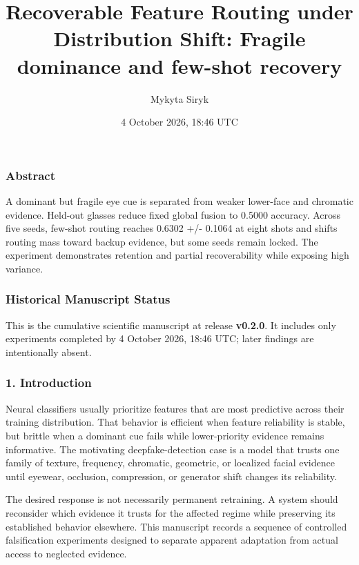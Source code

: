 \documentclass[
  10pt,
]{article}
\title{Recoverable Feature Routing under Distribution Shift: Fragile
dominance and few-shot recovery}
\author{Mykyta Siryk}
\date{4 October 2026, 18:46 UTC}
\begin{document}
\maketitle

\hypertarget{abstract}{%
\subsubsection{Abstract}\label{abstract}}

A dominant but fragile eye cue is separated from weaker lower-face and
chromatic evidence. Held-out glasses reduce fixed global fusion to
0.5000 accuracy. Across five seeds, few-shot routing reaches 0.6302 +/-
0.1064 at eight shots and shifts routing mass toward backup evidence,
but some seeds remain locked. The experiment demonstrates retention and
partial recoverability while exposing high variance.

\hypertarget{historical-manuscript-status}{%
\subsubsection{Historical Manuscript
Status}\label{historical-manuscript-status}}

This is the cumulative scientific manuscript at release \textbf{v0.2.0}.
It includes only experiments completed by 4 October 2026, 18:46 UTC;
later findings are intentionally absent.

\hypertarget{introduction}{%
\subsubsection{1. Introduction}\label{introduction}}

Neural classifiers usually prioritize features that are most predictive
across their training distribution. That behavior is efficient when
feature reliability is stable, but brittle when a dominant cue fails
while lower-priority evidence remains informative. The motivating
deepfake-detection case is a model that trusts one family of texture,
frequency, chromatic, geometric, or localized facial evidence until
eyewear, occlusion, compression, or generator shift changes its
reliability.

The desired response is not necessarily permanent retraining. A system
should reconsider which evidence it trusts for the affected regime while
preserving its established behavior elsewhere. This manuscript records a
sequence of controlled falsification experiments designed to separate
apparent adaptation from actual access to neglected evidence.
\end{document}
